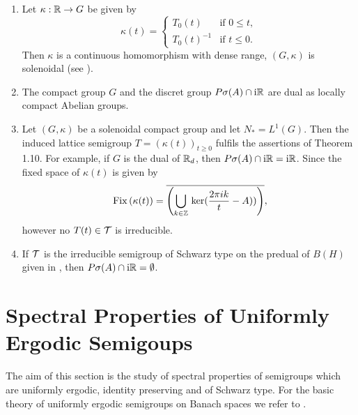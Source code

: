 \begin{remark}\label{rem:d3-1.14}
\begin{enumerate}[\upshape (i), wide, labelindent=.5em]
\item Let $\kappa:\mathbb{R} \to G$ be given by
\[
\kappa(t) = \begin{cases}
T_{0}(t) & \text{if } 0 \leq t , \\
T_{0}(t)^{-1} & \text{if } t \leq 0.
\end{cases}
\]
Then $\kappa$ is a continuous homomorphism with dense range, \ie $(G,\kappa)$ is solenoidal (see \citet{hewittross:1963}).

\item 
The compact group $G$ and the discret group $P\sigma(A) \cap \mathrm{i}\mathbb{R}$ are dual as locally compact Abelian groups.

\item 
Let $(G,\kappa)$ be a solenoidal compact group and let $N_{*} = L^{1}(G)$.
Then the induced lattice semigroup $T = (\kappa(t))_{t \geq 0}$ fulfils the assertions of Theorem 1.10.
For example, if $G$ is the dual of $\mathbb{R}_{d}$, then $P\sigma(A) \cap \mathrm{i}\mathbb{R} = \mathrm{i}\mathbb{R}$.
Since the fixed space of $\kappa(t)$ is given by
\[
	\mathop{}\mathrm{Fix}\left(\kappa(t)\right) = 
    \overline{ \left(\bigcup_{k \in \mathbb{Z}} \mathop{}\mathrm{ker}(\frac{2\pi ik}{t} - A)) \right) } ,
\]
however no $T(t) \in \mathcal{T}$ is irreducible.

\item 
If $\mathcal{T}$ is the irreducible semigroup of Schwarz type on the predual of $B(H)$ given in \citet{evans:1977}, then $P\sigma(A) \cap \mathrm{i}\mathbb{R} = \emptyset$.
\end{enumerate}
\end{remark}

\section{Spectral Properties of Uniformly Ergodic Semigoups}\label{sec:d3-2}
The aim of this section is the study of spectral properties of semigroups which are uniformly ergodic, identity preserving and of Schwarz type.
For the basic theory of uniformly ergodic semigroups on Banach spaces we refer to \citet{dunfordschwartz:1958}.

